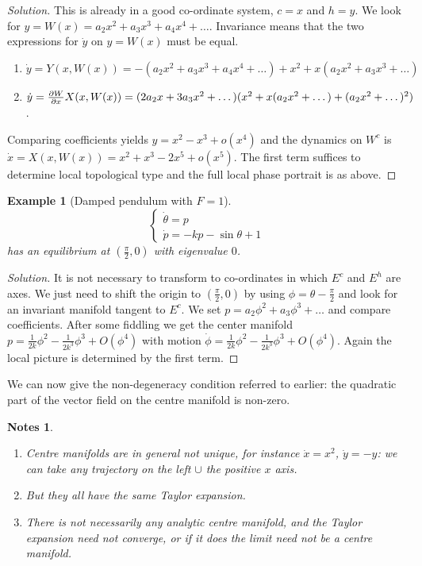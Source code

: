 \documentclass{notes}
\theoremstyle{plain}
\newtheorem*{example}{Example}
\newtheorem*{notes}{Notes}
\begin{document}
\begin{proof}[Solution]
This is already in a good co-ordinate system, $c=x$ and $h=y$.  We look
for $y = W(x) = a_2 x^2 + a_3 x^3 + a_4 x^4 + \dots$.  Invariance means
that the two expressions for $\dot{y}$ on $y = W(x)$ must be equal.

\begin{enumerate}
\item $\dot{y} = Y(x,W(x)) = -(a_2 x^2 + a_3 x^3 + a_4 x^4 + \dots)
+ x^2 + x(a_2 x^2 + a_3 x^3 + \dots)$
\item $\dot{y} = \frac{\partial W}{\partial x} X(x,W(x)) = (2 a_2 x + 3 a_3 x^2 + \dots)
(x^2 + x(a_2 x^2 + \dots) + (a_2 x^2 + \dots)^2)$.
\end{enumerate}

Comparing coefficients yields $y= x^2 - x^3 + o(x^4)$ and the dynamics
on $W^c$ is $\dot{x} = X(x,W(x)) = x^2 + x^3 - 2x^5 + o(x^5)$.  The
first term suffices to determine local topological type and the full local
phase portrait is as above.
\end{proof}

\begin{example}[Damped pendulum with $F=1$]
\[
\begin{cases}
\dot{\theta} = p \\
\dot{p} = -k p - \sin \theta + 1
\end{cases}
\]
has an equilibrium at $(\frac{\pi}{2},0)$ with eigenvalue $0$.
\end{example}

\vspace{1in}

\begin{proof}[Solution]
  It is not necessary to transform to co-ordinates in which $E^c$ and
  $E^h$ are axes.  We just need to shift the origin to
  $(\frac{\pi}{2},0)$ by using $\phi = \theta - \frac{\pi}{2}$ and
  look for an invariant manifold tangent to $E^c$.  We set $p = a_2
  \phi^2 + a_3 \phi^3 + \dots$ and compare coefficients.  After some
  fiddling we get the center manifold $p = \frac{1}{2k} \phi^2 -
  \frac{1}{2k^3} \phi^3 + O(\phi^4)$ with motion
  $\dot{\phi} = \frac{1}{2k} \phi^2 - \frac{1}{2k^3} \phi^3 + O(\phi^4)$.
  Again the local picture is determined by the first term.
\end{proof}

We can now give the non-degeneracy condition referred to earlier:
the quadratic part of the vector field on the centre manifold is non-zero.

\begin{notes}
\begin{enumerate}
\item Centre manifolds are in general not unique, for instance $\dot{x} =x^2$,
$\dot{y}= - y$: we can take any trajectory on the left $\cup$ the positive
$x$ axis.
\item But they all have the same Taylor expansion.
\item There is not necessarily any analytic centre manifold, and the Taylor
expansion need not converge, or if it does the limit need not be a centre
manifold.
\end{enumerate}
\end{notes}
\end{document}
